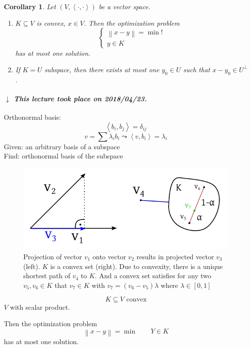 \documentclass[a4paper]{article}
\newcounter{lecref}[section]
\numberwithin{lecref}{section}
\newtheorem{corollary}[lecref]{Corollary}
\newcommand{\ip}[2]{\left\langle#1,#2\right\rangle} %
\newcommand{\angel}[1]{\left\langle#1\right\rangle}
\newcommand{\norm}[1]{\left\|#1\right\|}
\newcommand{\dateref}[1]{%
  \begin{mdframed}[backgroundcolor=gray!10,innerbottommargin=0pt,innertopmargin=0pt]
    \paragraph{\textit{$\downarrow$ This lecture took place on #1.}}%
  \end{mdframed}%
}
\begin{document}
\begin{corollary}
  Let $(V, \angel{\cdot,\cdot})$ be a vector space.
  \begin{enumerate}
    \item $K \subseteq V$ is convex, $x \in V$.
      Then the optimization problem
      \[
        \left\{\begin{array}{c}
          \norm{x - y} = \min! \\
          y \in K
        \end{array}\right.
      \]
      has at most one solution.
    \item If $K = U$ subspace,
      then there exists at most one $y_0 \in U$ such that $x - y_0 \in U^\bot$.
  \end{enumerate}
\end{corollary}

\dateref{2018/04/23}

Orthonormal basis:
\[ \ip{b_i}{b_j} = \delta_{ij} \]
\[ v = \sum \lambda_i b_i \leadsto \ip{v}{b_i} = \lambda_i \]
Given: an arbitrary basis of a subspace \\
Find: orthonormal basis of the subspace

\begin{figure}[t]
  \begin{center}
    \includegraphics{img/09b_projection_and_convexity.pdf}
    \caption{
      Projection of vector $v_1$ onto vector $v_2$ results in projected vector $v_3$ (left).
      $K$ is a convex set (right). Due to convexity, there is a unique shortest path of $v_4$ to $K$.
      And a convex set satisfies for any two $v_5, v_6 \in K$ that $v_7 \in K$ with $v_7 = (v_6 - v_5) \lambda$ where $\lambda \in [0, 1]$
    }
  \end{center}
\end{figure}

\[ K \subseteq V \text{ convex} \]
$V$ with scalar product.

Then the optimization problem
\[ \norm{x - y} = \min \qquad Y \in K \]
has at most one solution.
\end{document}
